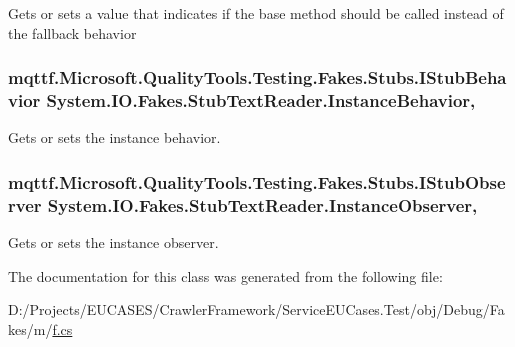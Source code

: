 Gets or sets a value that indicates if the base method should be called instead of the fallback behavior

\hypertarget{class_system_1_1_i_o_1_1_fakes_1_1_stub_text_reader_a263f84a058cffec09fd2eb1a29a83eb5}{
\subsubsection[{Instance\-Behavior}]{\setlength{\rightskip}{0pt plus 5cm}mqttf.\-Microsoft.\-Quality\-Tools.\-Testing.\-Fakes.\-Stubs.\-I\-Stub\-Behavior System.\-I\-O.\-Fakes.\-Stub\-Text\-Reader.\-Instance\-Behavior\hspace{0.3cm}{\ttfamily [get]}, {\ttfamily [set]}}}\label{class_system_1_1_i_o_1_1_fakes_1_1_stub_text_reader_a263f84a058cffec09fd2eb1a29a83eb5}


Gets or sets the instance behavior.

\hypertarget{class_system_1_1_i_o_1_1_fakes_1_1_stub_text_reader_a73884c57e732fd8cae4dee31ee0567d8}{
\subsubsection[{Instance\-Observer}]{\setlength{\rightskip}{0pt plus 5cm}mqttf.\-Microsoft.\-Quality\-Tools.\-Testing.\-Fakes.\-Stubs.\-I\-Stub\-Observer System.\-I\-O.\-Fakes.\-Stub\-Text\-Reader.\-Instance\-Observer\hspace{0.3cm}{\ttfamily [get]}, {\ttfamily [set]}}}\label{class_system_1_1_i_o_1_1_fakes_1_1_stub_text_reader_a73884c57e732fd8cae4dee31ee0567d8}


Gets or sets the instance observer.



The documentation for this class was generated from the following file\-:\begin{DoxyCompactItemize}
\item 
D\-:/\-Projects/\-E\-U\-C\-A\-S\-E\-S/\-Crawler\-Framework/\-Service\-E\-U\-Cases.\-Test/obj/\-Debug/\-Fakes/m/\hyperlink{m_2f_8cs}{f.\-cs}\end{DoxyCompactItemize}
